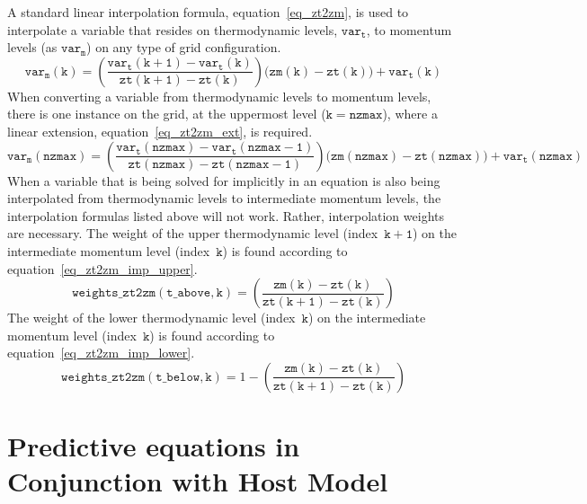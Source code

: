 \documentclass[11pt,fleqn]{article}
\begin{document}
A standard linear interpolation formula, equation~\ref{eq_zt2zm}, is used to 
interpolate a variable that resides on thermodynamic levels, $\mathtt{var_t}$, 
to momentum levels (as $\mathtt{var_m}$) on any type of grid configuration.
\begin{equation}
\label{eq_zt2zm}
\mathtt{var_m(k)}
   = \left( \frac{ \mathtt{var_t(k+1)} - \mathtt{var_t(k)} }
                 { \mathtt{zt(k+1)} - \mathtt{zt(k)} } \right)
     \Big( \mathtt{zm(k)} - \mathtt{zt(k)} \Big)
     + \mathtt{var_t(k)}
\end{equation}
When converting a variable from thermodynamic levels to momentum levels, there
is one instance on the grid, at the uppermost level ($\mathtt{k=nzmax}$), where 
a linear extension, equation~\ref{eq_zt2zm_ext}, is required.
\begin{equation}
\label{eq_zt2zm_ext}
\mathtt{var_m(nzmax)}
   = \left( \frac{ \mathtt{var_t(nzmax)} - \mathtt{var_t(nzmax-1)} }
                 { \mathtt{zt(nzmax)} - \mathtt{zt(nzmax-1)} } \right)
     \Big( \mathtt{zm(nzmax)} - \mathtt{zt(nzmax)} \Big)
     + \mathtt{var_t(nzmax)}
\end{equation}
When a variable that is being solved for implicitly in an equation is also being
interpolated from thermodynamic levels to intermediate momentum levels, the 
interpolation formulas listed above will not work.  Rather, interpolation 
weights are necessary.  The weight of the upper thermodynamic level 
(index~$\mathtt{k+1}$) on the intermediate momentum level (index~$\mathtt{k}$) 
is found according to equation~\ref{eq_zt2zm_imp_upper}.
\begin{equation}
\label{eq_zt2zm_imp_upper}
\mathtt{weights\_zt2zm(t\_above,k)}
   = \left( \frac{ \mathtt{zm(k)} - \mathtt{zt(k)} }
                 { \mathtt{zt(k+1)} - \mathtt{zt(k)} } \right)
\end{equation}
The weight of the lower thermodynamic level (index~$\mathtt{k}$) on the
intermediate momentum level (index~$\mathtt{k}$) is found according to
equation~\ref{eq_zt2zm_imp_lower}.
\begin{equation}
\label{eq_zt2zm_imp_lower}
\mathtt{weights\_zt2zm(t\_below,k)}
   = 1 - \left( \frac{ \mathtt{zm(k)} - \mathtt{zt(k)} }
                     { \mathtt{zt(k+1)} - \mathtt{zt(k)} } \right)
\end{equation}

\pagebreak

\section{Predictive equations in Conjunction with Host Model}
\end{document}
